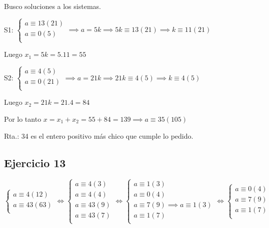 Busco soluciones a los sistemas.

S1: $ \begin{cases}
    a \equiv 13(21) \\
    a \equiv 0(5) \\
\end{cases} \implies a = 5k \implies 5k \equiv 13(21) \implies k \equiv 11(21) $

Luego $ x_1 = 5k = 5.11 = 55 $   

S2: $ \begin{cases}
    a \equiv 4(5) \\
    a \equiv 0(21) \\
\end{cases} \implies a = 21k \implies 21k \equiv 4(5) \implies k \equiv 4(5) $

Luego $ x_2 = 21k = 21.4 = 84 $   

Por lo tanto $ x = x_1 + x_2 = 55+84 = 139 \implies a \equiv 35(105)$

Rta.: 34 es el entero positivo más chico que cumple lo pedido.

\subsection{Ejercicio 13}

$ \begin{cases}
    a \equiv 4(12) \\
    a \equiv 43(63) \\
\end{cases} 
\iff \begin{cases}
    a \equiv 4(3) \\
    a \equiv 4(4) \\
    a \equiv 43(9) \\
    a \equiv 43(7) \\
\end{cases}
\iff \begin{cases}
    a \equiv 1(3) \\
    a \equiv 0(4) \\
    a \equiv 7(9) \implies a \equiv 1(3) \\
    a \equiv 1(7) \\
\end{cases}
\iff \begin{cases}
    a\equiv 0(4) \\
    a\equiv 7(9) \\
    a\equiv 1(7) \\
\end{cases} $


